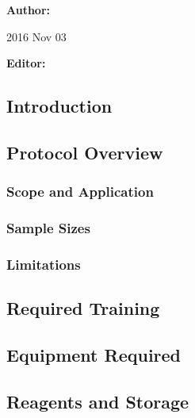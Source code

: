


\chapter*{}



\textbf{Author:} \author{M. Larsen}{2016 Nov 03}

\textbf{Editor:} 

\contact{}

\clearpage

\section{Introduction}

\section{Protocol Overview}
\subsection{Scope and Application}
\subsection{Sample Sizes}
\subsection{Limitations}

\section{Required Training}

\section{Equipment Required}

\section{Reagents and Storage}

